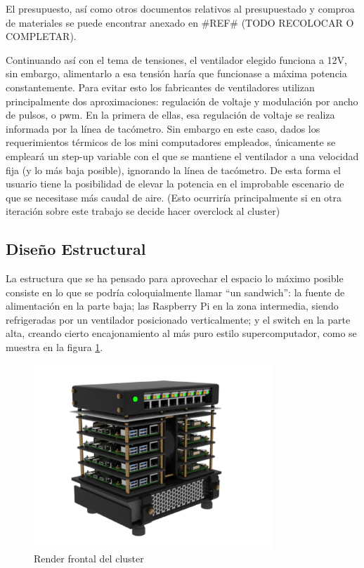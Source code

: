 El presupuesto, así como otros documentos relativos al presupuestado y comproa de materiales se puede encontrar anexado en \#REF\# (TODO RECOLOCAR O COMPLETAR).

Continuando así con el tema de tensiones, el ventilador elegido funciona a 12V, sin embargo, alimentarlo a esa tensión haría que funcionase a máxima potencia constantemente. Para evitar esto los fabricantes de ventiladores utilizan principalmente dos aproximaciones: regulación de voltaje y modulación por ancho de pulsos, o \acrshort{pwm}. En la primera de ellas, esa regulación de voltaje se realiza informada por la línea de tacómetro. Sin embargo en este caso,  dados los requerimientos térmicos de los mini computadores empleados, únicamente se empleará un step-up variable con el que se mantiene el ventilador a una velocidad fija (y lo más baja posible), ignorando la línea de tacómetro. De esta forma el usuario tiene la posibilidad de elevar la potencia en el improbable escenario de que se necesitase más caudal de aire. (Esto ocurriría principalmente si en otra iteración sobre este trabajo se decide hacer overclock al cluster)



\subsection{Diseño Estructural}
La estructura que se ha pensado para aprovechar el espacio lo máximo posible consiste en lo que se podría coloquialmente llamar ``un sandwich'': la fuente de alimentación en la parte baja; las Raspberry Pi en la zona intermedia, siendo refrigeradas por un ventilador posicionado verticalmente; y el switch en la parte alta, creando cierto encajonamiento al más puro estilo supercomputador, como se muestra en la figura \ref{fig:render_cluster_1}.

\begin{figure}[h!]
  \centering
  \includegraphics[width=0.8\textwidth]{img/render_cluster_1_provisional.png}
  \caption{Render frontal del cluster}
  \label{fig:render_cluster_1}
\end{figure}

